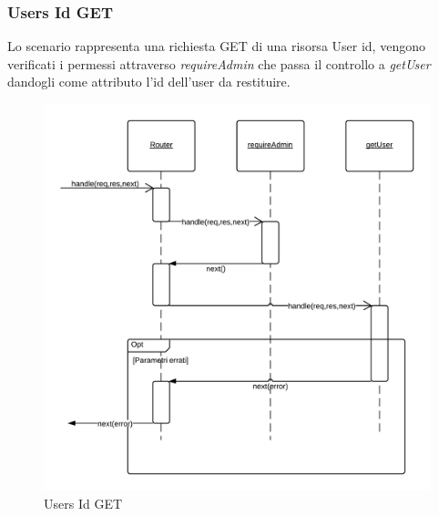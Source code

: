 \subsubsection{Users Id GET} 
Lo scenario rappresenta una richiesta GET di una risorsa User id, vengono verificati i permessi attraverso \emph{requireAdmin} che passa il controllo a \emph{getUser} dandogli come attributo l'id dell'user da restituire.
\begin{figure}[H]
	\begin{center} 
		\includegraphics[scale=0.20]{scenari/Users Id GET.png} 
		\caption{Users Id GET}
	\end{center} 
\end{figure}

